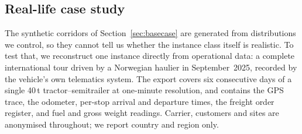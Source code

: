 %
%
%

\subsection{Real-life case study}
\label{sec:casestudy}

The synthetic corridors of Section~\ref{sec:basecase} are generated from
distributions we control, so they cannot tell us whether the instance class
itself is realistic.  To test that, we reconstruct one instance directly from
operational data: a complete international tour driven by a Norwegian haulier
in September~2025, recorded by the vehicle's own telematics system.  The
export covers six consecutive days of a single 40\,t tractor--semitrailer at
one-minute resolution, and contains the GPS trace, the odometer, per-stop
arrival and departure times, the freight order register, and fuel and gross
weight readings.  Carrier, customers and sites are anonymised throughout; we
report country and region only.

